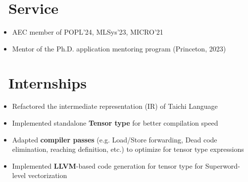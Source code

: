 \documentclass{resume}
\begin{document}
\section{\faHandGrabO\ Service}
\begin{itemize}
    \item AEC member of POPL'24, MLSys'23, MICRO'21
    \item Mentor of the Ph.D. application mentoring program (Princeton, 2023)
\end{itemize}

\section{\faCode\ Internships}
\begin{itemize}
    \item Refactored the intermediate representation (IR) of Taichi Language
    \item Implemented standalone \textbf{Tensor type} for better compilation speed
    \item Adapted \textbf{compiler passes} (e.g. Load/Store forwarding, Dead code elimination, reaching definition, etc.) to optimize for tensor type expressions
    \item Implemented \textbf{LLVM}-based code generation for tensor type for Superword-level vectorization
\end{itemize}
\end{document}

